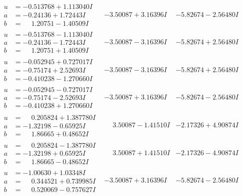 \documentclass[1p]{elsarticle_modified}
\theoremstyle{definition}
\begin{document}
$$\begin{array}{c|c|c}
\begin{aligned}
u &= -0.513768 + 1.113040 I \\
a &= -0.24136 + 1.72443 I \\
b &= \phantom{-}1.20751 - 1.40509 I\end{aligned}
 & -3.50087 + 3.16396 I & -5.82674 - 2.56480 I \\ \hline\begin{aligned}
u &= -0.513768 - 1.113040 I \\
a &= -0.24136 - 1.72443 I \\
b &= \phantom{-}1.20751 + 1.40509 I\end{aligned}
 & -3.50087 - 3.16396 I & -5.82674 + 2.56480 I \\ \hline\begin{aligned}
u &= -0.052945 + 0.727017 I \\
a &= -0.75174 + 2.52693 I \\
b &= -0.410238 - 1.270660 I\end{aligned}
 & -3.50087 - 3.16396 I & -5.82674 + 2.56480 I \\ \hline\begin{aligned}
u &= -0.052945 - 0.727017 I \\
a &= -0.75174 - 2.52693 I \\
b &= -0.410238 + 1.270660 I\end{aligned}
 & -3.50087 + 3.16396 I & -5.82674 - 2.56480 I \\ \hline\begin{aligned}
u &= \phantom{-}0.205824 + 1.387780 I \\
a &= -1.32198 - 0.65925 I \\
b &= \phantom{-}1.86665 + 0.48652 I\end{aligned}
 & \phantom{-}3.50087 - 1.41510 I & -2.17326 + 4.90874 I \\ \hline\begin{aligned}
u &= \phantom{-}0.205824 - 1.387780 I \\
a &= -1.32198 + 0.65925 I \\
b &= \phantom{-}1.86665 - 0.48652 I\end{aligned}
 & \phantom{-}3.50087 + 1.41510 I & -2.17326 - 4.90874 I \\ \hline\begin{aligned}
u &= -1.00630 + 1.03348 I \\
a &= \phantom{-}0.344521 + 0.739985 I \\
b &= \phantom{-}0.520069 - 0.757627 I\end{aligned}
 & -3.50087 + 3.16396 I & -5.82674 - 2.56480 I \\ \hline\begin{aligned}

\end{aligned}
\end{array}$$
\end{document}
